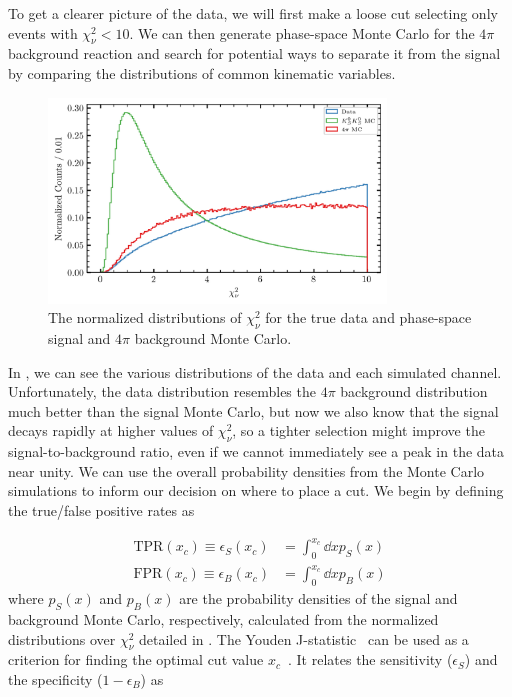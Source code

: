 To get a clearer picture of the data, we will first make a loose cut selecting only events with $\chi^2_\nu < 10$. We can then generate phase-space Monte Carlo for the $4\pi$ background reaction and search for potential ways to separate it from the signal by comparing the distributions of common kinematic variables.

\begin{figure}
  \begin{center}
    \includegraphics[width=0.8\textwidth]{figures/data_combined_chisqdof.png}
  \end{center}
  \caption{The normalized distributions of $\chi^2_\nu$ for the true data and phase-space signal and $4\pi$ background Monte Carlo.}\label{fig:data-combined-chisqdof}
\end{figure}

In , we can see the various distributions of the data and each simulated channel. Unfortunately, the data distribution resembles the $4\pi$ background distribution much better than the signal Monte Carlo, but now we also know that the signal decays rapidly at higher values of $\chi^2_\nu$, so a tighter selection might improve the signal-to-background ratio, even if we cannot immediately see a peak in the data near unity. We can use the overall probability densities from the Monte Carlo simulations to inform our decision on where to place a cut. We begin by defining the true/false positive rates as

\begin{align}
  \text{TPR}(x_c) \equiv \epsilon_S(x_c) &= \int_0^{x_c} \dd{x} p_S(x) \\
  \text{FPR}(x_c) \equiv \epsilon_B(x_c) &= \int_0^{x_c} \dd{x} p_B(x)
\end{align}
where $p_S(x)$ and $p_B(x)$ are the probability densities of the signal and background Monte Carlo, respectively, calculated from the normalized distributions over $\chi^2_\nu$ detailed in . The Youden J-statistic~\cite{Peirce1884,Youden1950} can be used as a criterion for finding the optimal cut value $x_c$~\cite{Schisterman2005,Powers2020}. It relates the sensitivity ($\epsilon_S$) and the specificity ($1-\epsilon_B$) as

